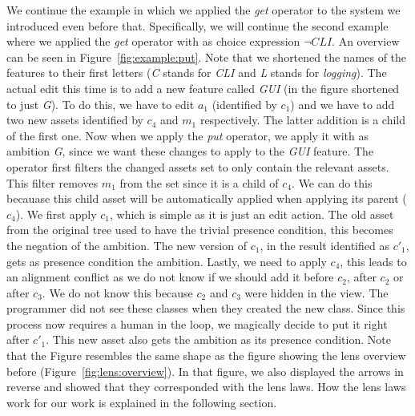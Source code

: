 \begin{example}\label{example:putoperator}
  We continue the example in which we applied the \emph{get} operator to the
  system we introduced even before that. Specifically, we will continue the
  second example where we applied the \emph{get} operator with as choice
  expression \(\neg\mathit{CLI}\). An overview can be seen in Figure~\ref{fig:example:put}.
  Note that we shortened the names of the features to their first letters (\emph{C} stands for
  \emph{CLI} and \emph{L} stands for \emph{logging}).
  The actual edit this time is to add a new feature called \emph{GUI} (in the
  figure shortened to just \emph{G}). To do this, we have to edit $a_1$ (identified
  by $c_1$) and we have to add two new assets identified by $c_4$ and $m_1$
  respectively. The latter addition is a child of the first one. Now when we apply
  the \emph{put} operator, we apply it with as ambition \emph{G}, since we want
  these changes to apply to the \emph{GUI} feature. The operator first filters the
  changed assets set to only contain the relevant assets. This filter removes $m_1$
  from the set since it is a child of $c_4$. We can do this becauase this child asset
  will be automatically applied when applying its parent ($c_4$).
  We first apply $c_1$, which is simple as it is just an edit action.
  The old asset from the original tree used to have the trivial presence condition,
  this becomes the negation of the ambition. The new version of $c_1$, in the result
  identified as $c'_1$, gets as presence condition the ambition. Lastly, we need to
  apply $c_4$, this leads to an alignment conflict as we do not know if we should add
  it before $c_2$, after $c_2$ or after $c_3$. We do not know this because $c_2$ and $c_3$
  were hidden in the view. The programmer did not see these classes when they created the
  new class. Since this process now requires a human in the loop, we magically decide to
  put it right after $c'_1$. This new asset also gets the ambition as its presence condition.
  Note that the Figure resembles the same shape as the figure showing the lens overview
  before (Figure~\ref{fig:lens:overview}). In that figure, we also displayed the arrows in
  reverse and showed that they corresponded with the lens laws. How the lens laws work for
  our work is explained in the following section.
\end{example}